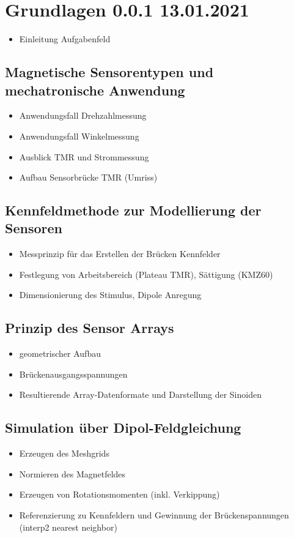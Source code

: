%

\chapter{Grundlagen 0.0.1 13.01.2021}
	\begin{itemize}
		\item Einleitung Aufgabenfeld
	\end{itemize}

\section{Magnetische Sensorentypen und mechatronische Anwendung}
	\begin{itemize}
		\item Anwendungsfall Drehzahlmessung
		\item Anwendungsfall Winkelmessung
		\item Ausblick TMR und Strommessung
		\item Aufbau Sensorbrücke TMR (Umriss)
	\end{itemize}

\section{Kennfeldmethode zur Modellierung der Sensoren}
	\begin{itemize}
		\item Messprinzip für das Erstellen der Brücken Kennfelder
		\item Festlegung von Arbeitsbereich (Plateau TMR), Sättigung (KMZ60)
		\item Dimensionierung des Stimulus, Dipole Anregung
	\end{itemize}

\section{Prinzip des Sensor Arrays}
	\begin{itemize}
		\item geometrischer Aufbau
		\item Brückenausgangsspannungen
		\item Resultierende Array-Datenformate und Darstellung der Sinoiden
	\end{itemize}

\section{Simulation über Dipol-Feldgleichung}
	\begin{itemize}
		\item Erzeugen des Meshgrids
		\item Normieren des Magnetfeldes
		\item Erzeugen von Rotationsmomenten (inkl. Verkippung)
		\item Referenzierung zu Kennfeldern und Gewinnung der Brückenspannungen (interp2 nearest neighbor)
	\end{itemize}

